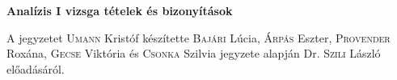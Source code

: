 \documentclass[a4paper,11.5pt]{article}
\begin{document}
	\def\a{\textbf{a}}
	\def\b{\textbf{b}}
	\def\N{\hskip 10 true mm}
	\def\a{\textbf{a}}
	\def\b{\textbf{b}}
	\def\c{\textbf{c}}
	\def\d{\textbf{d}}
	\def\e{\textbf{e}}
	\def\gg{$\gamma$}
	\def\vi{\textbf{i}}
	\def\jj{\textbf{j}}
	\def\kk{\textbf{k}}
	\def\fh{\overrightarrow}
	\def\l{\lambda}
	\def\m{\mu}
	\def\v{\textbf{v}}
	\def\0{\textbf{0}}
	\def\s{\hspace{0.2mm}\vphantom{\beta}}
	\def\Z{\mathbb{Z}}
	\def\Q{\mathbb{Q}}
	\def\R{\mathbb{R}}
	\def\C{\mathbb{C}}
	\def\N{\mathbb{N}}
	\def\Rn{\mathbb{R}^{n}}
	\def\Ra{\overline{\mathbb{R}}}
	\def\sume{\displaystyle\sum_{n=1}^{+\infty}}
	\def\sumn{\displaystyle\sum_{n=0}^{+\infty}}
	\def\biz{\emph{Bizonyítás:\ }}
	\def\narrow{\underset{n\rightarrow+\infty}{\longrightarrow}}
	\def\limn{\displaystyle\lim_{n\to +\infty}}
	
	\begin{center}
		\textbf{Analízis I vizsga tételek és bizonyítások}
	\end{center}
	
	\noindent A jegyzetet \textsc{Umann} Kristóf készítette \textsc{Bajári} Lúcia, \textsc{Árpás} Eszter, \textsc{Provender} Roxána, \textsc{Gecse} Viktória  és  \textsc{Csonka} Szilvia jegyzete alapján Dr. \textsc{Szili} László előadásáról.
	
\end{document}
